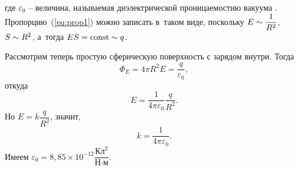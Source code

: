	где $\varepsilon_0$ -- величина, называемая диэлектрической проницаемостию вакуума . Пропорцию~(\ref{eq:prop1}) можно записать в~таком виде, поскольку $E\sim\dfrac{1}{R^2}$, $S\sim R^2$, а~тогда $ES=\mathrm{const}\sim q$.\par
	Рассмотрим теперь простую сферическую поверхность  с зарядом внутри. Тогда
		$$\Phi_E=4\pi R^2 E=\frac{q}{\varepsilon_0},$$
	откуда
		$$E=\frac{1}{4\pi\varepsilon_0}\frac{q}{R^2}.$$
	Но $E=k\dfrac{q}{R^2}$, значит,
		\begin{equation}
			k=\frac{1}{4\pi\varepsilon_0}.
		\end{equation}
	Имеем $\varepsilon_0=8,85\times 10^{-12} \dfrac{\text{Кл}^2}{\text{Н}\cdot\text{м}}$.